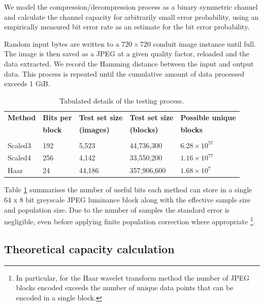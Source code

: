 We model the compression/decompression process as a binary symmetric channel and calculate the channel capacity for arbitrarily small error probability, using an empirically measured bit error rate as an estimate for the bit error probability.

Random input bytes are written to a $720 \times 720$ conduit image instance until full. The image is then saved as a JPEG at a given quality factor, reloaded and the data extracted. We record the Hamming distance between the input and output data. This process is repeated until the cumulative amount of data processed exceeds 1 GiB.

\begin{table}[tbph]
  \begin{center}
        \begin{tabular}{l l l l l}
        \textbf{Method} &\textbf{Bits per} &\textbf{Test set size} & \textbf{Test set size} &\textbf{Possible unique} \\ 
            &\textbf{block} &\textbf{(images)} &\textbf{(blocks)} &\textbf{blocks} \\ [0.1ex] \hline \\ [-1.5ex]
        Scaled3	&192	&5,523	&44,736,300	& $6.28 \times 10^{57}$ \\
        Scaled4	&256	&4,142	&33,550,200	& $1.16 \times 10^{77}$ \\
        Haar	&24	&44,186	&357,906,600	& $1.68 \times 10^{7}$ \\
        \end{tabular}
        \caption{Tabulated details of the testing process.}
        \label{tab:img-test}
    \end{center}
\end{table}

Table \ref{tab:img-test} summarises the number of useful bits each method can store in a single 64 x 8 bit greyscale JPEG luminance block along with the effective sample size and population size. Due to the number of samples the standard error is negligible, even before applying finite population correction where appropriate \footnote{In particular, for the Haar wavelet transform method the number of JPEG blocks encoded exceeds the number of unique data points that can be encoded in a single block.}. 

\subsection{Theoretical capacity calculation}
\label{ssec:capacity}

